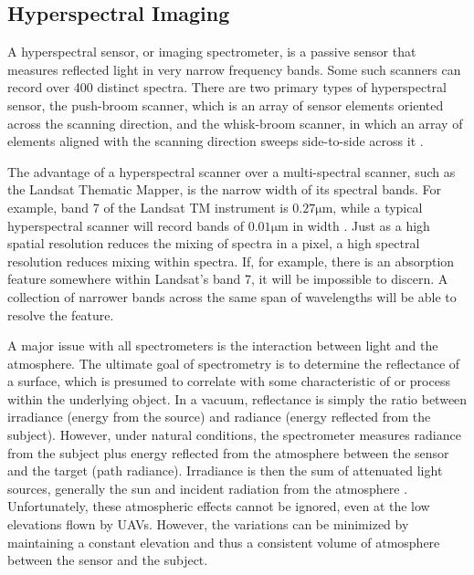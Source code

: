 \documentclass[10pt]{article}
\begin{document}
\subsection{Hyperspectral Imaging}

A hyperspectral sensor, or imaging spectrometer, is a passive sensor that measures reflected light in very narrow frequency bands. Some such scanners can record over 400 distinct spectra. There are two primary types of hyperspectral sensor, the push-broom scanner, which is an array of sensor elements oriented across the scanning direction, and the whisk-broom scanner, in which an array of elements aligned with the scanning direction sweeps side-to-side across it \cite{Lillesand1999}.

The advantage of a hyperspectral scanner over a multi-spectral scanner, such as the Landsat Thematic Mapper, is the narrow width of its spectral bands. For example, band 7 of the Landsat TM instrument is $0.27\si{\um}$, while a typical hyperspectral scanner will record bands of $0.01\si{\um}$ in width \cite{Lillesand1999}. Just as a high spatial resolution reduces the mixing of spectra in a pixel, a high spectral resolution reduces mixing within spectra. If, for example, there is an absorption feature somewhere within Landsat's band 7, it will be impossible to discern. A collection of narrower  bands across the same span of wavelengths will be able to resolve the feature.

A major issue with all spectrometers is the interaction between light and the atmosphere. The ultimate goal of spectrometry is to determine the reflectance of a surface, which is presumed to correlate with some characteristic of or process within the underlying object. In a vacuum, reflectance is simply the ratio between irradiance (energy from the source) and radiance (energy reflected from the subject). However, under natural conditions, the spectrometer measures radiance from the subject plus energy reflected from the atmosphere between the sensor and the target (path radiance). Irradiance is then the sum of attenuated light sources, generally the sun and incident radiation from the atmosphere \cite{Lillesand1999}. Unfortunately, these atmospheric effects cannot be ignored, even at the low elevations flown by UAVs. However, the variations can be minimized by maintaining a constant elevation and thus a consistent volume of atmosphere between the sensor and the subject.
\end{document}
